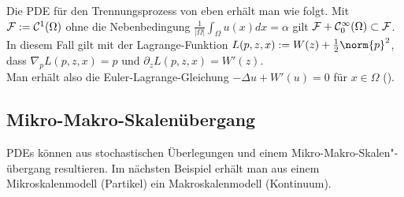 \linie

\begin{Bsp}
    Die PDE für den Trennungsprozess von eben erhält man wie folgt.
    Mit $\mathcal{F} := \mathcal{C}^1(\Omega)$ ohne die Nebenbedingung
    $\frac{1}{|\Omega|} \int_\Omega u(x)dx = \alpha$
    gilt $\mathcal{F} + \mathcal{C}_0^\infty(\Omega) \subset \mathcal{F}$.
    In diesem Fall gilt mit der Lagrange-Funktion $L(p, z, x) := W(z) + \frac{1}{2} \norm{p}^2$,
    dass $\nabla_p L(p, z, x) = p$ und $\partial_z L(p, z, x) = W'(z)$.\\
    Man erhält also die Euler-Lagrange-Gleichung
    $-\Delta u + W'(u) = 0$ für $x \in \Omega$
    ().
\end{Bsp}

\subsection{%
    Mikro-Makro-Skalenübergang%
}

\begin{Bem}
    PDEs können aus stochastischen Überlegungen und einem Mikro-Makro-Skalen"-übergang resultieren.
    Im nächsten Beispiel erhält man aus einem Mikroskalenmodell (Partikel) ein
    Makroskalenmodell (Kontinuum).
\end{Bem}

\linie

